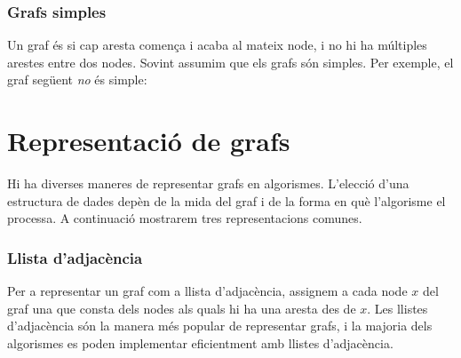\subsubsection{Grafs simples}


Un graf és  si cap aresta comença i acaba al mateix node,
i no hi ha múltiples arestes entre dos nodes. Sovint assumim que els
grafs són simples. Per exemple, el graf següent \emph{no} és simple:
\begin{center}
\end{center}


\section{Representació de grafs}

Hi ha diverses maneres de representar grafs en algorismes. L'elecció
d'una estructura de dades depèn de la mida del graf i de la forma en
què l'algorisme el processa. A continuació mostrarem tres
representacions comunes.

\subsubsection{Llista d'adjacència}


Per a representar un graf com a llista d'adjacència, assignem a cada
node $x$ del graf una  que consta dels nodes
als quals hi ha una aresta des de $x$. Les llistes d'adjacència són la
manera més popular de representar grafs, i la majoria dels algorismes
es poden implementar eficientment amb llistes d'adjacència.

